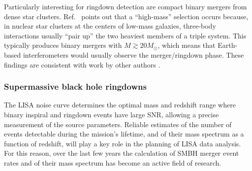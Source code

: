 \documentclass[]{iopart}
\begin{document}
Particularly interesting for ringdown detection are compact binary mergers
from dense star clusters. Ref.~\cite{Miller:2008yw} points out that a
``high-mass'' selection occurs because, in nuclear star clusters at the
centers of low-mass galaxies, three-body interactions usually ``pair up'' the
two heaviest members of a triple system. This typically produces binary
mergers with $M\gtrsim 20M_\odot$, which means that Earth-based
interferometers would usually observe the merger/ringdown phase. These
findings are consistent with work by other authors
\cite{O'Leary:2005tb,O'Leary:2007qa,O'Leary:2008xt}.

\subsubsection*{Supermassive black hole ringdowns}

The LISA noise curve determines the optimal mass and redshift range where
binary inspiral and ringdown events have large SNR, allowing a precise
measurement of the source parameters. Reliable estimates of the number of
events detectable during the mission's lifetime, and of their mass spectrum as
a function of redshift, will play a key role in the planning of LISA data
analysis. For this reason, over the last few years the calculation of SMBH
merger event rates and of their mass spectrum has become an active field of
research.
\end{document}
